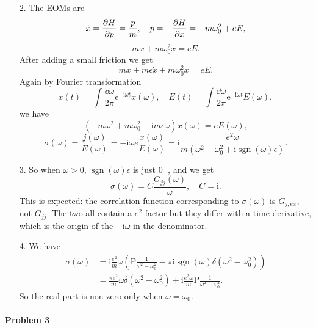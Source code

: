\documentclass[hyperref, a4paper]{article}
\DeclareMathOperator{\sgn}{sgn}
\newcommand*{\ii}{\mathrm{i}}
\newcommand*{\ee}{\mathrm{e}}
\begin{document}
\begin{itemize}
\item[2.] The EOMs are 
\[
    \dot{x} = \pdv{H}{p} = \frac{p}{m}, \quad \dot{p} = - \pdv{H}{x} = - m \omega_0^2 + eE,
\]
\[
    m\ddot{x} + m \omega_0^2 x = e E.
\]
After adding a small friction we get 
\begin{equation}
    m\ddot{x} + m \epsilon \dot{x} + m \omega_0^2 x = e E.
\end{equation}
Again by Fourier transformation
\[
    x(t) = \int \frac{\dd{\omega}}{2\pi} \ee^{- \ii \omega t} x(\omega), \quad 
    E(t) = \int \frac{\dd{\omega}}{2\pi} \ee^{- \ii \omega t} E(\omega),
\] 
we have 
\[
    (- m \omega^2 + m \omega_0^2 - \ii m \epsilon \omega) x(\omega) = e E(\omega),
\]
\begin{equation}
    \sigma(\omega) = \frac{j(\omega)}{E(\omega)} = - \ii \omega e \frac{x(\omega)}{E(\omega)}
    = \ii \frac{e^2 \omega}{m (\omega^2 - \omega_0^2 + \ii \sgn(\omega) \epsilon)}.
\end{equation}

\item[3.] So when $\omega > 0$, $\sgn(\omega) \epsilon$ is just $0^+$, and we get 
\begin{equation}
    \sigma(\omega) = C \frac{G_{jj} (\omega)}{\omega}, \quad C = \ii.
\end{equation}
This is expected: the correlation function corresponding to $\sigma(\omega)$ is $G_{j, ex}$,
not $G_{jj}$.
The two all contain a $e^2$ factor but they differ with a time derivative,
which is the origin of the $- \ii \omega$ in the denominator.

\item[4.] We have 
\begin{equation}
    \begin{aligned}
        \sigma(\omega) &= \ii \frac{e^2}{m} \omega \left(
            \mathrm{P} \frac{1}{\omega^2 - \omega_0^2} - \pi \ii \sgn(\omega) \delta(\omega^2 - \omega_0^2) 
        \right) \\
        &= \frac{\pi e^2}{m} \omega \delta (\omega^2 - \omega_0^2) 
        + \ii \frac{e^2 \omega}{m} \mathrm{P} \frac{1}{\omega^2 - \omega_0^2}.
    \end{aligned}
\end{equation}
So the real part is non-zero only when $\omega = \omega_0$.

\end{itemize}

\paragraph{Problem 3}
\end{document}
